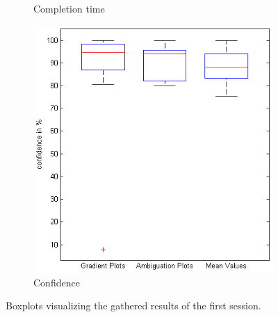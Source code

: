 \begin{figure}[H]
\begin{subfigure}[b]{0.32\textwidth}
        \caption{Completion time}
        \label{fig:s1_time}
    \end{subfigure}
		\begin{subfigure}[b]{0.32\textwidth}
        \includegraphics[width=\textwidth]{figures/boxplots/s1_confidence.png}
        \caption{Confidence}
        \label{fig:s1_confidence}
    \end{subfigure}
    \caption{Boxplots visualizing the gathered results of the first session.}
		\label{fig:s1_boxplots}
\end{figure}

